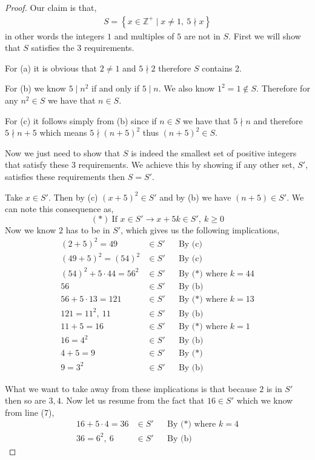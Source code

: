\documentclass[11pt]{article}
\newcommand{\zz}{\mathbb Z}   %
\newcommand{\set}[1]{\left\{#1\right\}} %
\renewcommand{\geq}{\geqslant}
\begin{document}
\begin{proof}
    Our claim is that,
    \begin{align*}
        S = \set{x \in \zz^{+} \mid x \neq 1,\ 5 \nmid x}
    \end{align*}
    in other words the integers $1$ and multiples of $5$ are not in $S$. First we will show that $S$ satisfies the 3 requirements. 

    For (a) it is obvious that $2 \neq 1$ and $5 \nmid 2$ therefore $S$ contains 2. 

    For (b) we know $5 \mid n^{2}$ if and only if $5 \mid n$. We also know $1^{2} = 1 \notin S$. Therefore for any $n^{2} \in S$ we have that $n \in S$.

    For (c) it follows simply from (b) since if $n \in S$ we have that $5\nmid n $ and therefore $5\nmid n+5$ which means $5 \nmid (n+5)^{2}$ thus $(n+5)^{2} \in S$.

    Now we just need to show that $S$ is indeed the smallest set of positive integers that satisfy these 3 requirements. We achieve this by showing if any other set, $S'$, satisfies these requirements then $S = S'$.

    Take $x \in S'$. Then by (c) $(x + 5)^{2} \in S'$ and by (b) we have $(n +5) \in S'$. We can note this consequence as, \[(*)\ \text{If }x \in S'  \rightarrow x+5k \in S', \ k \geq 0\] Now we know $2$ has to be in $S'$, which gives us the following implications,
    \begin{align}
        (2 + 5)^{2} = 49 &\in S' && \text{By (c)} \\
        (49 + 5)^{2} = (54)^{2} &\in S' && \text{By (c)} \\
        (54)^{2} + 5\cdot 44 = 56^{2} &\in S' && \text{By (*) where $k = 44$} \\
        56 &\in S' && \text{By (b)} \\
         56 + 5\cdot 13 = 121 &\in S' && \text{By (*) where $k = 13$} \\
         121 = 11^{2}, \ 11 &\in S' && \text{By (b)} \\
         11 + 5 = 16 &\in S' && \text{By (*) where $k = 1$} \\
         16 = 4^{2}&\in S' && \text{By (b)} \\
         4 + 5 = 9 &\in S' && \text{By (*)} \\
         9 = 3^{2} &\in S' && \text{By (b)}  
    \end{align}

    What we want to take away from these implications is that because $2$ is in $S'$ then so are $3,4$. Now let us resume from the fact that $16 \in S'$ which we know from line (7),
    \begin{align}
        16 + 5 \cdot 4 = 36 &\in S' && \text{By (*) where $k = 4$} \\
        36 = 6^{2}, \ 6 &\in S' && \text{By (b)}
    \end{align}


\end{proof}
\end{document}
